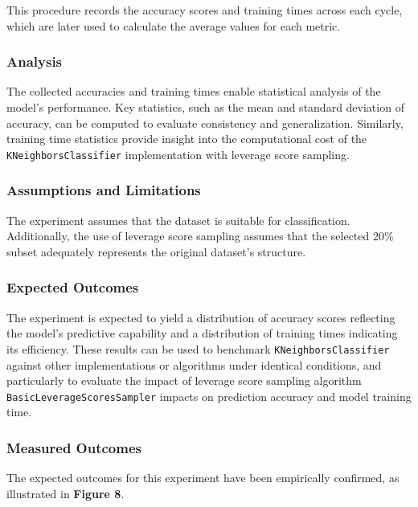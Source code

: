 \documentclass{article}
\theoremstyle{plain}
\theoremstyle{definition}
\theoremstyle{remark}
\begin{document}
This procedure records the accuracy scores and training times across each cycle, which are later used to calculate the average values for each metric.

\subsubsection{Analysis}

The collected accuracies and training times enable statistical analysis of the model's performance. Key statistics, such as the mean and standard deviation of accuracy, can be computed to evaluate consistency and generalization. Similarly, training time statistics provide insight into the computational cost of the \texttt{KNeighborsClassifier} implementation with leverage score sampling.

\subsubsection{Assumptions and Limitations}

The experiment assumes that the dataset is suitable for classification. Additionally, the use of leverage score sampling assumes that the selected 20\% subset adequately represents the original dataset's structure.

\subsubsection{Expected Outcomes}

The experiment is expected to yield a distribution of accuracy scores reflecting the model's predictive capability and a distribution of training times indicating its efficiency. These results can be used to benchmark \texttt{KNeighborsClassifier} against other implementations or algorithms under identical conditions, and particularly to evaluate the impact of leverage score sampling algorithm \texttt{BasicLeverageScoresSampler} impacts on prediction accuracy and model training time.

\subsubsection{Measured Outcomes}

The expected outcomes for this experiment have been empirically confirmed, as illustrated in \textbf{Figure 8}.
\end{document}
